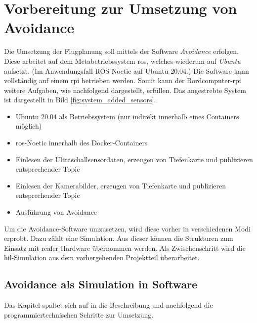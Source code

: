 \chapter{Vorbereitung zur Umsetzung von Avoidance}\label{chap:intro_avoidance}
Die Umsetzung der Flugplanung soll mittels der Software \textit{Avoidance} erfolgen. Diese arbeitet auf dem Metabetriebssystem \acrshort{ros}, welches wiederum auf \textit{Ubuntu} aufsetzt. (Im Anwendungsfall ROS Noetic auf Ubuntu 20.04.) Die Software kann vollständig auf einem \gls{rpi} betrieben werden. Somit kann der Bordcomputer-\gls{rpi} weitere Aufgaben, wie nachfolgend dargestellt, erfüllen. Das angestrebte System ist dargestellt in Bild \ref{fig:system_added_sensors}.

\begin{itemize}
    \item Ubuntu 20.04 als Betriebssystem (nur indirekt innerhalb eines Containers möglich)
    \item \acrshort{ros}-Noetic innerhalb des Docker-Containers
    \item Einlesen der Ultraschallsensordaten, erzeugen von Tiefenkarte und publizieren entsprechender Topic
    \item Einlesen der Kamerabilder, erzeugen von Tiefenkarte und publizieren entsprechender Topic
    \item Ausführung von Avoidance
\end{itemize}

Um die Avoidance-Software umzusetzen, wird diese vorher in verschiedenen Modi erprobt. Dazu zählt eine Simulation. Aus dieser können die Strukturen zum Einsatz mit realer Hardware übernommen werden. Als Zwischenschritt wird die \gls{hil}-Simulation aus dem vorhergehenden Projektteil überarbeitet.

\section{Avoidance als Simulation in Software}\label{chap:sim_gazebo}
Das Kapitel spaltet sich auf in die Beschreibung und nachfolgend die programmiertechnischen Schritte zur Umsetzung.

